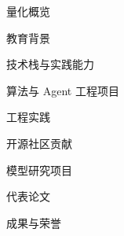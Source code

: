 \documentclass{resume}
\begin{document}
\makecvheader
\begin{rSectionWithTags}{量化概览}{\enspace{}\enspace{}\enspace{}}
\ExampleStats
\end{rSectionWithTags}
\begin{rSection}{教育背景}
\ExampleEducation
\end{rSection}
\begin{rSection}{技术栈与实践能力}
\ExampleSkills
\end{rSection}
\begin{rSection}{算法与 Agent 工程项目}
\AssistantProject
\WorkflowProject
\end{rSection}
\begin{rSection}{工程实践}
\ExamplePractice
\end{rSection}
\newpage
\begin{rSectionWithTags}{开源社区贡献}{}
\ExampleContributions
\end{rSectionWithTags}
\begin{rSection}{模型研究项目}
\HeatProject
\UncertaintyProject
\end{rSection}
\begin{rSection}{代表论文}
\ExamplePublications
\end{rSection}
\begin{rSection}{成果与荣誉}
\ExampleAwards
\end{rSection}
\end{document}
